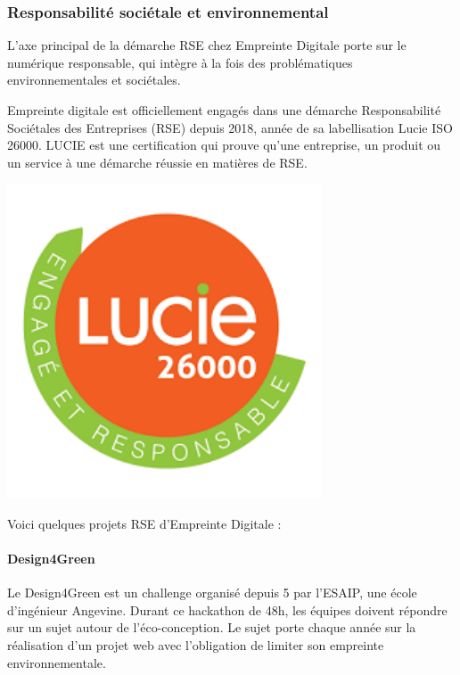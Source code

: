 \documentclass[12pt]{article}
\begin{document}
\subsubsection{Responsabilité sociétale et environnemental}
L'axe principal de la démarche RSE chez Empreinte Digitale porte sur le numérique responsable, qui intègre à la fois des problématiques environnementales et sociétales.

\noindent%
\begin{minipage}{.7\textwidth}%
Empreinte digitale est officiellement engagés dans une démarche Responsabilité Sociétales des Entreprises (RSE) depuis 2018, année de sa labellisation Lucie ISO 26000. 
LUCIE est une certification qui prouve qu'une entreprise, un produit ou un service à une démarche réussie en matières de RSE.

\end{minipage}%
\hfill
\begin{minipage}{.3\textwidth}%
\begin{center}
\includegraphics[width=0.7\textwidth]{src/lucie.png}
\end{center}
\end{minipage}%

Voici quelques projets RSE d'Empreinte Digitale :
\paragraph{Design4Green}
Le Design4Green est un challenge organisé depuis 5 par l'ESAIP, une école d'ingénieur Angevine.
Durant ce hackathon de 48h, les équipes doivent répondre sur un sujet autour de l'éco-conception. 
Le sujet porte chaque année sur la réalisation d'un projet web avec l'obligation de limiter son empreinte environnementale.
\end{document}
